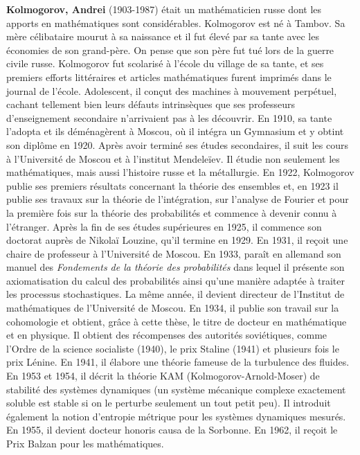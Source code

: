 \textbf{Kolmogorov, Andrei} (1903-1987) était un mathématicien russe dont les apports en mathématiques sont considérables. Kolmogorov est né à Tambov. Sa mère célibataire mourut à sa naissance et il fut élevé par sa tante avec les économies de son grand-père. On pense que son père fut tué lors de la guerre civile russe. Kolmogorov fut scolarisé à l'école du village de sa tante, et ses premiers efforts littéraires et articles mathématiques furent imprimés dans le journal de l'école. Adolescent, il conçut des machines à mouvement perpétuel, cachant tellement bien leurs défauts intrinsèques que ses professeurs d'enseignement secondaire n'arrivaient pas à les découvrir. En 1910, sa tante l'adopta et ils déménagèrent à Moscou, où il intégra un Gymnasium et y obtint son diplôme en 1920. Après avoir terminé ses études secondaires, il suit les cours à l'Université de Moscou et à l'institut Mendeleïev. Il étudie non seulement les mathématiques, mais aussi l'histoire russe et la métallurgie. En 1922, Kolmogorov publie ses premiers résultats concernant la théorie des ensembles et, en 1923 il publie ses travaux sur la théorie de l'intégration, sur l'analyse de Fourier et pour la première fois sur la théorie des probabilités et commence à devenir connu à l'étranger. Après la fin de ses études supérieures en 1925, il commence son doctorat auprès de Nikolaï Louzine, qu'il termine en 1929. En 1931, il reçoit une chaire de professeur à l'Université de Moscou. En 1933, paraît en allemand son manuel des \textit{Fondements de la théorie des probabilités} dans lequel il présente son axiomatisation du calcul des probabilités ainsi qu'une manière adaptée à traiter les processus stochastiques. La même année, il devient directeur de l'Institut de mathématiques de l'Université de Moscou. En 1934, il publie son travail sur la cohomologie et obtient, grâce à cette thèse, le titre de docteur en mathématique et en physique. Il obtient des récompenses des autorités soviétiques, comme l'Ordre de la science socialiste (1940), le prix Staline (1941) et plusieurs fois le prix Lénine. En 1941, il élabore une théorie fameuse de la turbulence des fluides. En 1953 et 1954, il décrit la théorie KAM (Kolmogorov-Arnold-Moser) de stabilité des systèmes dynamiques (un système mécanique complexe exactement soluble est stable si on le perturbe seulement un tout petit peu). Il introduit également la notion d'entropie métrique pour les systèmes dynamiques mesurés. En 1955, il devient docteur honoris causa de la Sorbonne. En 1962, il reçoit le Prix Balzan pour les mathématiques.

